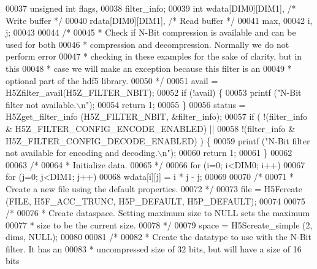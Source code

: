 \begin{DoxyCode}
00037     \textcolor{keywordtype}{unsigned} \textcolor{keywordtype}{int}    flags,
00038                     filter\_info;
00039     \textcolor{keywordtype}{int}             wdata[DIM0][DIM1],          \textcolor{comment}{/* Write buffer */}
00040                     rdata[DIM0][DIM1],          \textcolor{comment}{/* Read buffer */}
00041                     max,
00042                     i, j;
00043 
00044     \textcolor{comment}{/*}
00045 \textcolor{comment}{     * Check if N-Bit compression is available and can be used for both}
00046 \textcolor{comment}{     * compression and decompression.  Normally we do not perform error}
00047 \textcolor{comment}{     * checking in these examples for the sake of clarity, but in this}
00048 \textcolor{comment}{     * case we will make an exception because this filter is an}
00049 \textcolor{comment}{     * optional part of the hdf5 library.}
00050 \textcolor{comment}{     */}
00051     avail = H5Zfilter\_avail(H5Z\_FILTER\_NBIT);
00052     \textcolor{keywordflow}{if} (!avail) \{
00053         printf (\textcolor{stringliteral}{"N-Bit filter not available.\(\backslash\)n"});
00054         \textcolor{keywordflow}{return} 1;
00055     \}
00056     status = H5Zget\_filter\_info (H5Z\_FILTER\_NBIT, &filter\_info);
00057     \textcolor{keywordflow}{if} ( !(filter\_info & H5Z\_FILTER\_CONFIG\_ENCODE\_ENABLED) ||
00058                 !(filter\_info & H5Z\_FILTER\_CONFIG\_DECODE\_ENABLED) ) \{
00059         printf (\textcolor{stringliteral}{"N-Bit filter not available for encoding and decoding.\(\backslash\)n"});
00060         \textcolor{keywordflow}{return} 1;
00061     \}
00062 
00063     \textcolor{comment}{/*}
00064 \textcolor{comment}{     * Initialize data.}
00065 \textcolor{comment}{     */}
00066     \textcolor{keywordflow}{for} (i=0; i<DIM0; i++)
00067         \textcolor{keywordflow}{for} (j=0; j<DIM1; j++)
00068             wdata[i][j] = i * j - j;
00069 
00070     \textcolor{comment}{/*}
00071 \textcolor{comment}{     * Create a new file using the default properties.}
00072 \textcolor{comment}{     */}
00073     file = H5Fcreate (FILE, H5F\_ACC\_TRUNC, H5P\_DEFAULT, H5P\_DEFAULT);
00074 
00075     \textcolor{comment}{/*}
00076 \textcolor{comment}{     * Create dataspace.  Setting maximum size to NULL sets the maximum}
00077 \textcolor{comment}{     * size to be the current size.}
00078 \textcolor{comment}{     */}
00079     space = H5Screate\_simple (2, dims, NULL);
00080 
00081     \textcolor{comment}{/*}
00082 \textcolor{comment}{     * Create the datatype to use with the N-Bit filter.  It has an}
00083 \textcolor{comment}{     * uncompressed size of 32 bits, but will have a size of 16 bits}

\end{DoxyCode}
